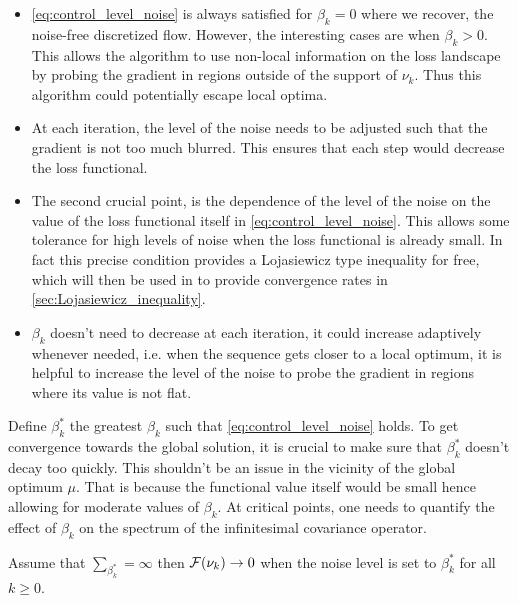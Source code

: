 \begin{remark}

\begin{itemize}
	\item \cref{eq:control_level_noise} is always satisfied for $\beta_k = 0$ where we recover, the noise-free discretized flow. However, the interesting cases are when $\beta_k>0$. This allows the algorithm to use non-local information on the loss landscape by probing the gradient in regions outside of the support of $\nu_k$. Thus this algorithm could potentially escape local optima. 
	\item At each iteration, the level of the noise needs to be adjusted such that the gradient is not too much blurred. This ensures that each step would decrease the loss functional.
	\item The second crucial point, is the dependence of the level of the noise on the value of the loss functional itself in \cref{eq:control_level_noise}. This allows some tolerance for high levels of noise when the loss functional is already small. In fact this precise condition provides a Lojasiewicz type inequality for free, which will then be used in  to provide convergence rates in  \cref{sec:Lojasiewicz_inequality}.
	\item $\beta_k$ doesn't need to decrease at each iteration, it could increase adaptively whenever needed, i.e. when  the sequence gets closer to a local optimum, it is helpful to increase the level of the noise to probe the gradient in regions where its value is not flat.
\end{itemize}
 \end{remark}
 
 Define $\beta_k^{*}$ the greatest $\beta_k$ such that \cref{eq:control_level_noise} holds. To get convergence towards the global solution, it is crucial to make sure that $\beta_k^{*}$ doesn't decay too quickly. This shouldn't be an issue in the vicinity of the global optimum $\mu$. That is because the functional value itself would be small hence allowing for moderate values of $\beta_k$. At critical points, one needs to quantify the effect of $\beta_k$ on the spectrum of the infinitesimal covariance operator.   
 
 
 \begin{theorem}\label{thm:convergence}
 Assume that $\sum_{\beta_k^{*}} = \infty$ then ${{\mathcal F}}(\nu_k)\rightarrow 0$ when the noise level is set to $\beta_k^{*}$ for all $k\geq0$. 
 \end{theorem}
 



